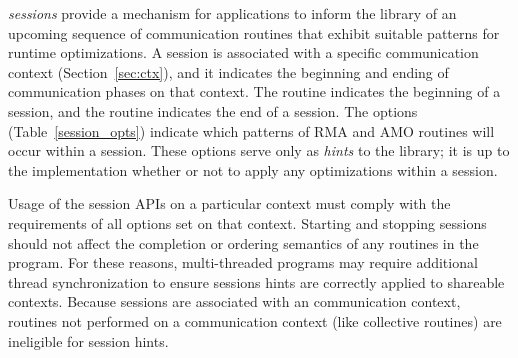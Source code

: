 \openshmem \emph{sessions} provide a mechanism for applications to inform the
\openshmem library of an upcoming sequence of communication routines that
exhibit suitable patterns for runtime optimizations.
A session is associated with a specific \openshmem communication context
(Section~\ref{sec:ctx}), and it indicates the beginning and ending of
communication phases on that context.
The  routine indicates the beginning of a session,
and the  routine indicates the end of a session.
The  options (Table~\ref{session_opts}) indicate
which patterns of \openshmem RMA and AMO routines will occur within a session.
These options serve only as \textit{hints} to the library; it is up to the
implementation whether or not to apply any optimizations within a session.

Usage of the \openshmem session APIs on a particular context must comply with
the requirements of all options set on that context.
Starting and stopping \openshmem sessions should not affect the completion or
ordering semantics of any \openshmem routines in the program.
For these reasons, multi-threaded \openshmem programs may require additional
thread synchronization to ensure sessions hints are correctly applied to
shareable contexts.
Because sessions are associated with an \openshmem communication context,
routines not performed on a communication context (like collective routines)
are ineligible for session hints.
